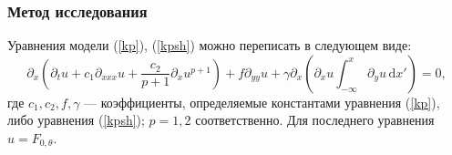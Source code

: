 \subsubsection{Метод исследования}
Уравнения модели (\ref {kp}), (\ref {kpsh}) можно переписать в следующем виде:
\begin{equation}
	\label{kp3gen}
	\partial_x\left(\partial_t u+c_1 \partial_{xxx} u+\frac{c_2 }{p+1}\partial_x u^{p+1}\right)+f \partial_{yy} u+\gamma \partial_x\left(\partial_x u \int_{-\infty}^x \partial_y u \, \mathrm{d} x'\right)=0,
\end{equation}
где $ c_1, c_2, f, \gamma $ --- коэффициенты, определяемые константами уравнения (\ref{kp}), либо уравнения (\ref{kpsh}); $ p = 1,2 $ соответственно. Для последнего уравнения $u = F_{0, \theta} $.

